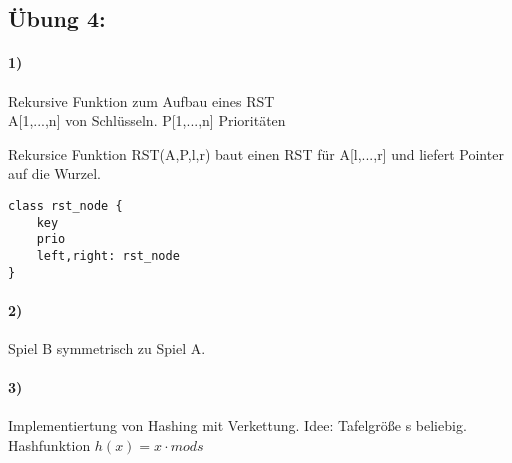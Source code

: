 \subsection*{Übung 4:}
\paragraph{1)} Rekursive Funktion zum Aufbau eines RST \\
A[1,...,n] von Schlüsseln. P[1,...,n] Prioritäten

\begin{algorithm}
\end{algorithm}

Rekursice Funktion RST(A,P,l,r) baut einen RST für A[l,...,r] und liefert Pointer auf die Wurzel.

\begin{verbatim}
class rst_node {
    key
    prio
    left,right: rst_node
}
\end{verbatim}

\begin{algorithm}
\end{algorithm}




\paragraph{2)}
Spiel B symmetrisch zu Spiel A.

\paragraph{3)} Implementiertung von Hashing mit Verkettung. Idee:
Tafelgröße s beliebig. Hashfunktion $ h(x) = x \cdot mod s $\\
\begin{algorithm}[H]
\end{algorithm}

